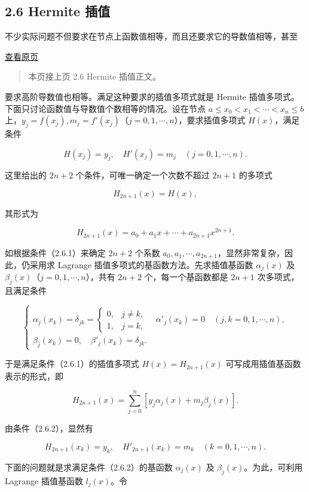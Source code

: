 \documentclass[
  10pt,
  fontset=fandol]{ctexart}
\begin{document}
\subsection{2.6 Hermite 插值}\label{hermite-ux63d2ux503c}

不少实际问题不但要求在节点上函数值相等，而且还要求它的导数值相等，甚至

\href{../../source-images/pdf-043.jpeg}{查看原页}

\begin{quote}
本页接上页 2.6 Hermite 插值正文。
\end{quote}

要求高阶导数值也相等。满足这种要求的插值多项式就是 Hermite 插值多项式。下面只讨论函数值与导数值个数相等的情况。设在节点 \(a\leqslant x_0<x_1<\cdots<x_n\leqslant b\) 上，\(y_j=f(x_j),m_j=f'(x_j)\)（\(j=0,1,\cdots,n\)），要求插值多项式 \(H(x)\)，满足条件

\[
H(x_j)=y_j,\quad H'(x_j)=m_j\quad(j=0,1,\cdots,n).\tag{2.6.1}
\]

这里给出的 \(2n+2\) 个条件，可唯一确定一个次数不超过 \(2n+1\) 的多项式

\[H_{2n+1}(x)=H(x),\]

其形式为

\[H_{2n+1}(x)=a_0+a_1x+\cdots+a_{2n+1}x^{2n+1}.\]

如根据条件（2.6.1）来确定 \(2n+2\) 个系数 \(a_0,a_1,\cdots,a_{2n+1}\)，显然非常复杂，因此，仍采用求 Lagrange 插值多项式的基函数方法。先求插值基函数 \(\alpha_j(x)\) 及 \(\beta_j(x)\)（\(j=0,1,\cdots,n\)），共有 \(2n+2\) 个，每一个基函数都是 \(2n+1\) 次多项式，且满足条件

\[
\begin{cases}
\alpha_j(x_k)=\delta_{jk}=\begin{cases}0,&j\ne k,\\1,&j=k,\end{cases}\quad \alpha'_j(x_k)=0\quad(j,k=0,1,\cdots,n),\\
\beta_j(x_k)=0,\quad \beta'_j(x_k)=\delta_{jk}.
\end{cases}\tag{2.6.2}
\]

于是满足条件（2.6.1）的插值多项式 \(H(x)=H_{2n+1}(x)\) 可写成用插值基函数表示的形式，即

\[H_{2n+1}(x)=\sum_{j=0}^{n}[y_j\alpha_j(x)+m_j\beta_j(x)].\tag{2.6.3}\]

由条件（2.6.2），显然有

\[H_{2n+1}(x_k)=y_k,\quad H'_{2n+1}(x_k)=m_k\quad(k=0,1,\cdots,n).\]

下面的问题就是求满足条件（2.6.2）的基函数 \(\alpha_j(x)\) 及 \(\beta_j(x)\)。为此，可利用 Lagrange 插值基函数 \(l_j(x)\)。令
\end{document}
